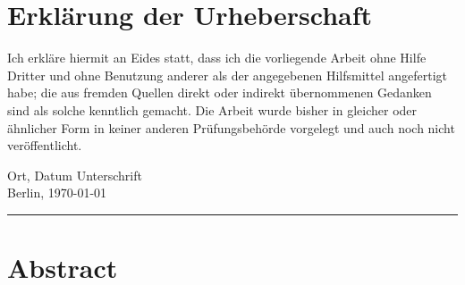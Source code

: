 	\begin{flushright}
		
	\end{flushright}
	
	
	

\cleardoublepage



\chapter*{Erkl{\"a}rung der Urheberschaft}
Ich erkläre hiermit an Eides statt, dass ich die vorliegende Arbeit ohne Hilfe Dritter und ohne Benutzung anderer als der angegebenen Hilfsmittel angefertigt habe; die aus fremden Quellen direkt oder indirekt übernommenen Gedanken sind als solche kenntlich gemacht. Die Arbeit wurde bisher in gleicher oder ähnlicher Form in keiner anderen Prüfungsbehörde vorgelegt und auch noch nicht veröffentlicht.


\vspace{4cm}

Ort, Datum \hfill Unterschrift\\
	Berlin, \today  	\hfill \rule[0.5em]{15em}{0.5pt} %

\newpage
\chapter*{Abstract}

